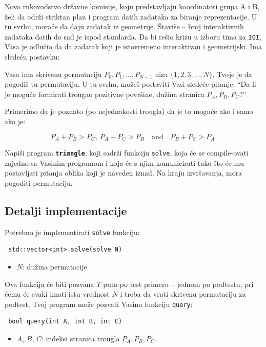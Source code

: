 \documentclass[12pt]{article}
\begin{document}
\renewcommand{\headerLang}{English}
\renewcommand{\problemName}{AB23. TRIANGLE}

\renewcommand{\headerLeft}{IATI Day 2, Senior group}
\renewcommand{\headerRightFirst}{XVII INTERNATIONAL ADVANCED TOURNAMENT IN INFORMATICS}
\renewcommand{\headerRightSecond}{ONLINE 2026}

\renewcommand{\tl}{$10$ sec.}
\renewcommand{\ml}{$1024$ MB}
\problem{Problem \problemName}

Novo rukovodstvo državne komisije, koju predstavljaju koordinatori grupa A i B, želi da održi striktan plan i program datih zadataka za biranje reprezentacije. U tu svrhu, moraće da daju zadatak iz geometrije. Štaviše -- broj interaktivnih zadataka datih do sad je ispod standarda. Da bi rešio krizu u izboru tima za \texttt{IOI}, Vasa je odlučio da da zadatak koji je istovremeno interaktivan i geometrijski. Ima sledeću postavku:

Vasa ima skrivenu permutaciju $P_0,P_1,...,P_{N-1}$ niza $\{1,2,3,...,N\}$. Tvoje je da pogodiš tu permutaciju. U tu svrhu, možeš postaviti Vasi sledeće pitanje: ``Da li je moguće formirati trougao pozitivne površine, dužina stranica $P_A,P_B,P_C$?''

Primerimo da je poznato (po nejednakosti trougla) da je to moguće ako i samo ako je:

\[P_A + P_B > P_C,\ P_A + P_C > P_B \quad \text{and} \quad P_B + P_C > P_A.\]

Napiši program \textbf{\texttt{triangle}}, koji sadrži funkciju \texttt{solve}, koja će se compile-ovati zajedno sa Vasinim programom i koja će s njim komunicirati tako što će mu postavljati pitanja oblika koji je naveden iznad. Na kraju izvršavanja, mora pogoditi permutaciju.

\subsection{Detalji implementacije}
Potrebno je implementirati \texttt{solve} funkciju:
\begin{lstlisting}
 std::vector<int> solve(solve N)
\end{lstlisting}
\begin{itemize}
	\item $N$: dužina permutacije.
\end{itemize}

Ova funkcija će biti pozvana $T$ puta po test primeru -- jednom po podtestu, pri čemu će svaki imati istu vrednost $N$ i treba da vrati skrivenu permutaciju za podtest. Tvoj program može pozvati Vasinu funkciju \texttt{query}:
\begin{lstlisting}
 bool query(int A, int B, int C)
\end{lstlisting}
\begin{itemize}
	\item $A$, $B$, $C$: indeksi stranica trougla $P_A, P_B, P_C$.
\end{itemize}
\end{document}
